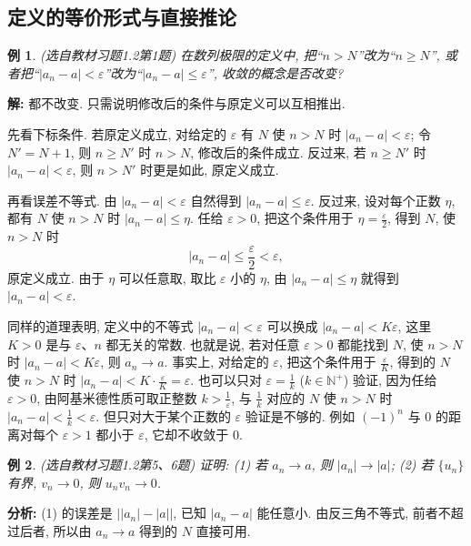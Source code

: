 \documentclass[UTF8,openany]{ctexbook}
\theoremstyle{chinesetextbook}
\newtheorem{example}{例}[section]
\newenvironment{cnsolution}{\par\indent\textbf{解:} \ignorespaces}{\par}
\begin{document}
\subsection{定义的等价形式与直接推论}
\begin{example}
\textnormal{(选自教材习题1.2第1题)} 在数列极限的定义中, 把“$n>N$”改为“$n\ge N$”, 或者把“$|a_n-a|<\varepsilon$”改为“$|a_n-a|\le\varepsilon$”, 收敛的概念是否改变?
\end{example}
\begin{cnsolution}
都不改变. 只需说明修改后的条件与原定义可以互相推出.

先看下标条件. 若原定义成立, 对给定的 $\varepsilon$ 有 $N$ 使 $n>N$ 时 $|a_n-a|<\varepsilon$; 令 $N'=N+1$, 则 $n\ge N'$ 时 $n>N$, 修改后的条件成立. 反过来, 若 $n\ge N'$ 时 $|a_n-a|<\varepsilon$, 则 $n>N'$ 时更是如此, 原定义成立.

再看误差不等式. 由 $|a_n-a|<\varepsilon$ 自然得到 $|a_n-a|\le\varepsilon$. 反过来, 设对每个正数 $\eta$, 都有 $N$ 使 $n>N$ 时 $|a_n-a|\le\eta$. 任给 $\varepsilon>0$, 把这个条件用于 $\displaystyle\eta=\frac\varepsilon2$, 得到 $N$, 使 $n>N$ 时
\[
|a_n-a|\le\frac\varepsilon2<\varepsilon,
\]
原定义成立. 由于 $\eta$ 可以任意取, 取比 $\varepsilon$ 小的 $\eta$, 由 $|a_n-a|\le\eta$ 就得到 $|a_n-a|<\varepsilon$.
\end{cnsolution}
同样的道理表明, 定义中的不等式 $|a_n-a|<\varepsilon$ 可以换成 $|a_n-a|<K\varepsilon$, 这里 $K>0$ 是与 $\varepsilon$、$n$ 都无关的常数. 也就是说, 若对任意 $\varepsilon>0$ 都能找到 $N$, 使 $n>N$ 时 $|a_n-a|<K\varepsilon$, 则 $a_n\to a$. 事实上, 对给定的 $\varepsilon$, 把这个条件用于 $\displaystyle\frac\varepsilon K$, 得到的 $N$ 使 $n>N$ 时 $\displaystyle|a_n-a|<K\cdot\frac\varepsilon K=\varepsilon$. 也可以只对 $\displaystyle\varepsilon=\frac1k$ ($k\in\mathbb N^+$) 验证, 因为任给 $\varepsilon>0$, 由阿基米德性质可取正整数 $\displaystyle k>\frac1\varepsilon$, 与 $\displaystyle\frac1k$ 对应的 $N$ 使 $n>N$ 时 $\displaystyle|a_n-a|<\frac1k<\varepsilon$. 但只对大于某个正数的 $\varepsilon$ 验证是不够的. 例如 $(-1)^n$ 与 $0$ 的距离对每个 $\varepsilon>1$ 都小于 $\varepsilon$, 它却不收敛于 $0$.
\begin{example}
\textnormal{(选自教材习题1.2第5、6题)} 证明: (1) 若 $a_n\to a$, 则 $|a_n|\to|a|$; (2) 若 $\{u_n\}$ 有界, $v_n\to0$, 则 $u_nv_n\to0$.
\end{example}
\par\indent\textbf{分析:} (1) 的误差是 $\bigl||a_n|-|a|\bigr|$, 已知 $|a_n-a|$ 能任意小. 由反三角不等式, 前者不超过后者, 所以由 $a_n\to a$ 得到的 $N$ 直接可用.
\end{document}
